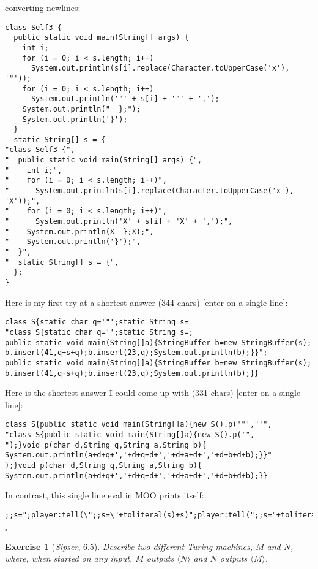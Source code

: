 \documentclass{article}
\theoremstyle{break}			%
\newtheorem{exercise}{Exercise}
\theoremstyle{plain}
\newcommand{\sipser}{\textit{Sipser}}
\newcommand{\encoding}[1]{\ensuremath{\langle#1\rangle}}
\begin{document}
converting newlines:
\begin{verbatim}
class Self3 {
  public static void main(String[] args) {
    int i;
    for (i = 0; i < s.length; i++)
      System.out.println(s[i].replace(Character.toUpperCase('x'), '"'));
    for (i = 0; i < s.length; i++)
      System.out.println('"' + s[i] + '"' + ',');
    System.out.println("  };");
    System.out.println('}');
  }
  static String[] s = {
"class Self3 {",
"  public static void main(String[] args) {",
"    int i;",
"    for (i = 0; i < s.length; i++)",
"      System.out.println(s[i].replace(Character.toUpperCase('x'), 'X'));",
"    for (i = 0; i < s.length; i++)",
"      System.out.println('X' + s[i] + 'X' + ',');",
"    System.out.println(X  };X);",
"    System.out.println('}');",
"  }",
"  static String[] s = {",
  };
}
\end{verbatim}
\noindent Here is my first try at a shortest answer (344 chars) [enter
on a single line]:
\begin{verbatim}
class S{static char q='"';static String s=
"class S{static char q='';static String s=;
public static void main(String[]a){StringBuffer b=new StringBuffer(s);
b.insert(41,q+s+q);b.insert(23,q);System.out.println(b);}}";
public static void main(String[]a){StringBuffer b=new StringBuffer(s);
b.insert(41,q+s+q);b.insert(23,q);System.out.println(b);}}
\end{verbatim}
\noindent Here is the shortest answer I could come up with (331 chars)
[enter on a single line]:
\begin{verbatim}
class S{public static void main(String[]a){new S().p('"',"'",
"class S{public static void main(String[]a){new S().p('",
");}void p(char d,String q,String a,String b){
System.out.println(a+d+q+','+d+q+d+','+d+a+d+','+d+b+d+b);}}"
);}void p(char d,String q,String a,String b){
System.out.println(a+d+q+','+d+q+d+','+d+a+d+','+d+b+d+b);}}
\end{verbatim}
In contrast, this single line eval in MOO prints itself:
\begin{verbatim}
;;s=";player:tell(\";;s=\"+toliteral(s)+s)";player:tell(";;s="+toliteral(s)+s)
\end{verbatim}
\par$\square$\pagebreak
\begin{exercise}[\sipser, 6.5]
Describe two different Turing machines, $M$ and $N$, where, when
started on any input, $M$ outputs \encoding N and $N$ outputs
\encoding M.
\end{exercise}
\end{document}
